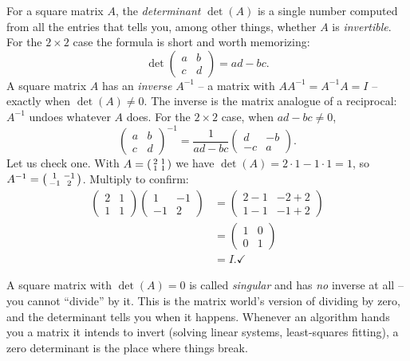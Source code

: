 For a square matrix $A$, the \emph{determinant} $\det(A)$ is a single number
computed from all the entries that tells you, among other things, whether $A$ is
\emph{invertible}. For the $2 \times 2$ case the formula is short and worth
memorizing:
\[
\det\!\begin{pmatrix} a & b \\ c & d \end{pmatrix} = ad - bc.
\]
A square matrix $A$ has an \emph{inverse} $A^{-1}$ -- a matrix with
$A A^{-1} = A^{-1} A = I$ -- exactly when $\det(A) \ne 0$. The inverse is the
matrix analogue of a reciprocal: $A^{-1}$ undoes whatever $A$ does. For the
$2 \times 2$ case, when $ad - bc \ne 0$,
\[
\begin{pmatrix} a & b \\ c & d \end{pmatrix}^{-1}
= \frac{1}{ad - bc}\begin{pmatrix} d & -b \\ -c & a \end{pmatrix}.
\]
Let us check one. With $A = \begin{psmallmatrix} 2 & 1 \\ 1 & 1 \end{psmallmatrix}$
we have $\det(A) = 2\cdot 1 - 1 \cdot 1 = 1$, so
$A^{-1} = \begin{psmallmatrix} 1 & -1 \\ -1 & 2 \end{psmallmatrix}$. Multiply to
confirm:
\begin{align*}
\begin{pmatrix} 2 & 1 \\ 1 & 1 \end{pmatrix}
\begin{pmatrix} 1 & -1 \\ -1 & 2 \end{pmatrix}
&= \begin{pmatrix} 2{-}1 & -2{+}2 \\ 1{-}1 & -1{+}2 \end{pmatrix} \\
&= \begin{pmatrix} 1 & 0 \\ 0 & 1 \end{pmatrix} \\
&= I. \checkmark
\end{align*}

\begin{trapbox}
A square matrix with $\det(A) = 0$ is called \emph{singular} and has \emph{no}
inverse at all -- you cannot ``divide'' by it. This is the matrix world's version
of dividing by zero, and the determinant tells you when it happens. Whenever
an algorithm hands you a matrix it intends to invert (solving linear systems,
least-squares fitting), a zero determinant is the place where things break.
\end{trapbox}

